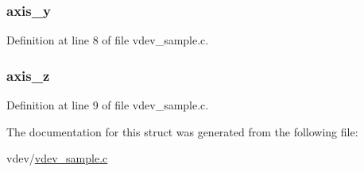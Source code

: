 \hypertarget{structvdev__sample__regs_aee31f70174d5b49133d692f81cff4a6d}{
\subsubsection[{axis\-\_\-y}]{ {\bf axis\-\_\-y}}}\label{structvdev__sample__regs_aee31f70174d5b49133d692f81cff4a6d}


\-Definition at line 8 of file vdev\-\_\-sample.\-c.

\hypertarget{structvdev__sample__regs_a029159ff03e2997021f9c10127be21f8}{
\subsubsection[{axis\-\_\-z}]{ {\bf axis\-\_\-z}}}\label{structvdev__sample__regs_a029159ff03e2997021f9c10127be21f8}


\-Definition at line 9 of file vdev\-\_\-sample.\-c.



\-The documentation for this struct was generated from the following file\-:\begin{DoxyCompactItemize}
\item 
vdev/\hyperlink{vdev__sample_8c}{vdev\-\_\-sample.\-c}\end{DoxyCompactItemize}
